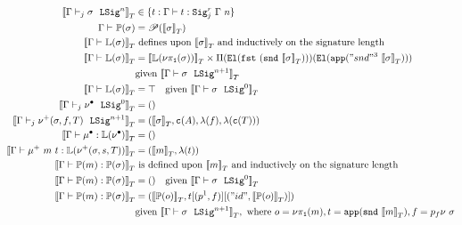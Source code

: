 \begin{align*}
  \denotesT{\goodSigU{j}{\Gamma}{\lsig}{n}} &\in \{t : \goodTerm{\Gm}{t}{\Sigr{\Gm}{n}{j}} \} \\
  {\goodType{\Gamma}{\TyTkg{\lsig}}{}} &= \mathscr{P}(\denotesT{\lsig}) \\
  \denotesT{\goodType{\Gamma}{\TyLkg{\sigma}}{}} &\text{ defines upon } \denotesT{\lsig} 
  \text{ and inductively on the signature length} \\
  \denotesT{\goodType{\Gamma}{\TyLkg{\sigma}}{}} &=
  \denotesT{\TyLkg{\lsigproj{1}{\sigma}}} \times \Pi(\El{\fst{(\snd{\denotesT{\sigma}})}})(\El{\app{"snd"^3~\denotesT{\sigma}}}) \\
  &\text{given } \denotesT{\goodSig{\Gamma}{\sigma}{n+1}} \\
  \denotesT{\goodType{\Gamma}{\TyLkg{\sigma}}{}} &= \top \quad
  \text{given } \denotesT{\goodSig{\Gamma}{\sigma}{0}} \\
  \denotesT{\goodSigU{j}{\Gamma}{\LSigEmp}{0}} &= \unit \\
  \denotesT{\goodSigU{j}{\Gamma}{\LSigAdd{\sigma}{f}{T}}{n+1}} &= (\denotesT{\sigma}, \codety{A}, \lam{f}, \lam{\codety{T}}) \\
  \denotesT{\goodTerm{\Gamma}{\LkgEmp}{\TyLkg{\LSigEmp}}} &= \unit \\
  \denotesT{\goodTerm{\Gamma}{\mu^+~m~t}{\TyLkg{\LSigAdd{\sigma}{s}{T}}}} &= (\denotesT{m}, \lam{t}) \\
  \denotesT{\goodTerm{\Gamma}{\Tkg{m}}{\TyTkg {\sigma}}} & \text{ is defined upon } \denotesT{m} \text{ and inductively on the signature length} \\
  \denotesT{\goodTerm{\Gamma}{\Tkg {m}}{\TyTkg {\sigma}}} &= () \quad \text{given } \denotesT{\goodSig{\Gamma}{\sigma}{0}} \\
  \denotesT{\goodTerm{\Gamma}{\Tkg {m}}{\TyTkg {\sigma}}} &= 
  (\denotesT{\Tkg {o}}, t[(\SubstExt{p^1}{f})][(\SubstExt{"id"}{\denotesT{\Tkg {o}}})]) \\
  & \text{given } \denotesT{\goodSig{\Gamma}{\sigma}{n+1}}, \text{ where } o = \lsigproj{1}{m}, t = \app{\snd{\denotesT{m}}}, f = p_f\nu~\sigma 
\end{align*}



